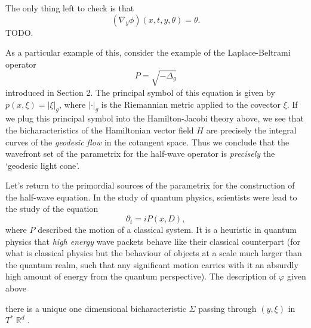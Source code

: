 \documentclass{article}
\theoremstyle{plain}
\theoremstyle{remark}
\theoremstyle{definition}
\DeclareMathOperator{\RR}{\mathbb{R}}
\begin{document}
The only thing left to check is that
%
\[ (\nabla_{y} \phi)(x,t,y,\theta) = \theta. \]
%
TODO.

As a particular example of this, consider the example of the Laplace-Beltrami operator
%
\[ P = \sqrt{-\Delta_g} \]
%
introduced in Section 2. The principal symbol of this equation is given by $p(x,\xi) = |\xi|_g$, where $|\cdot|_g$ is the Riemannian metric applied to the covector $\xi$. If we plug this principal symbol into the Hamilton-Jacobi theory above, we see that the bicharacteristics of the Hamiltonian vector field $H$ are precisely the integral curves of the \emph{geodesic flow} in the cotangent space. Thus we conclude that the wavefront set of the parametrix for the half-wave operator is \emph{precisely} the `geodesic light cone'.

Let's return to the primordial sources of the parametrix for the construction of the half-wave equation. In the study of quantum physics, scientists were lead to the study of the equation
%
\[ \partial_t = i P(x,D), \]
%
where $P$ described the motion of a classical system. It is a heuristic in quantum physics that \emph{high energy} wave packets behave like their classical counterpart (for what is classical physics but the behaviour of objects at a scale much larger than the quantum realm, such that any significant motion carries with it an absurdly high amount of energy from the quantum perspective). The description of $\varphi$ given above 


 there is a unique one dimensional bicharacteristic $\Sigma$ passing through $(y,\xi)$ in $T^* \RR^d$.
\end{document}
